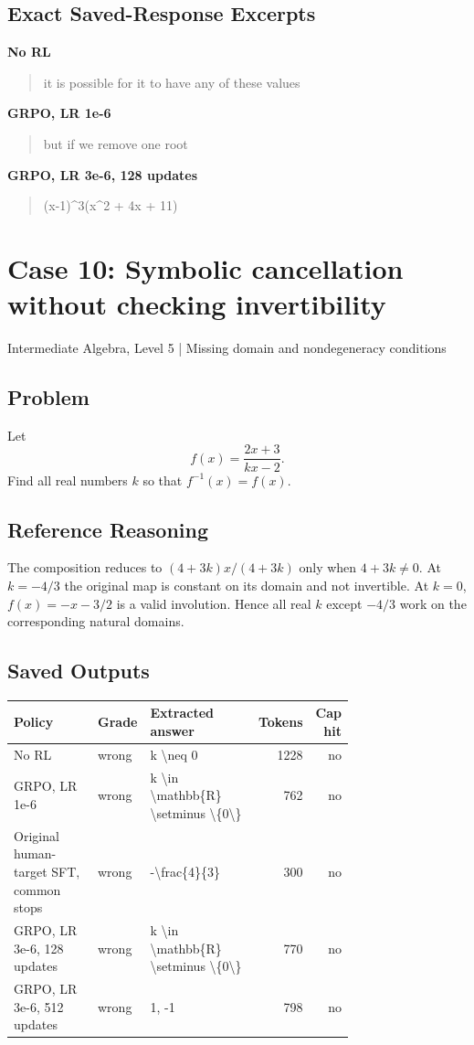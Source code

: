 \documentclass[10pt,letterpaper]{article}
\begin{document}
\subsection*{Exact Saved-Response Excerpts}
\textbf{No RL}
\begin{quote}\small\raggedright it is possible for it to have any of these values\end{quote}
\textbf{GRPO, LR 1e-6}
\begin{quote}\small\raggedright but if we remove one root\end{quote}
\textbf{GRPO, LR 3e-6, 128 updates}
\begin{quote}\small\raggedright (x-1)\textasciicircum{}3(x\textasciicircum{}2 + 4x + 11)\end{quote}
\clearpage\section*{Case 10: Symbolic cancellation without checking invertibility}
Intermediate Algebra, Level 5 | Missing domain and nondegeneracy conditions
\subsection*{Problem}
Let
\[f(x) = \frac{2x + 3}{kx - 2}.\]Find all real numbers $k$ so that $f^{-1}(x) = f(x).$
\subsection*{Reference Reasoning}
The composition reduces to $(4+3k)x/(4+3k)$ only when $4+3k\ne0$. At $k=-4/3$ the original map is constant on its domain and not invertible. At $k=0$, $f(x)=-x-3/2$ is a valid involution. Hence all real $k$ except $-4/3$ work on the corresponding natural domains.
\subsection*{Saved Outputs}
\small\begin{longtable}{p{0.29\linewidth}p{0.10\linewidth}p{0.35\linewidth}rr}\toprule Policy & Grade & Extracted answer & Tokens & Cap hit\\\midrule
No RL & wrong & k \textbackslash{}neq 0 & 1228 & no\\
GRPO, LR 1e-6 & wrong & k \textbackslash{}in \textbackslash{}mathbb\{R\} \textbackslash{}setminus \textbackslash{}\{0\textbackslash{}\} & 762 & no\\
Original human-target SFT, common stops & wrong & -\textbackslash{}frac\{4\}\{3\} & 300 & no\\
GRPO, LR 3e-6, 128 updates & wrong & k \textbackslash{}in \textbackslash{}mathbb\{R\} \textbackslash{}setminus \textbackslash{}\{0\textbackslash{}\} & 770 & no\\
GRPO, LR 3e-6, 512 updates & wrong & 1, -1 & 798 & no\\
\bottomrule\end{longtable}\normalsize
\end{document}
